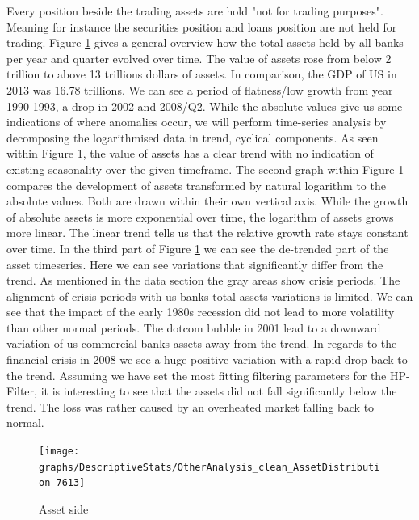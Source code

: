 \documentclass[12pt, a4paper]{article} %
\begin{document}
 Every position beside the trading assets are hold "not for trading purposes". Meaning for instance the securities position and loans position are not held for trading. 
 Figure \ref{fig:assets} gives a general overview how the total assets held by all banks per year and quarter evolved over time. The value of assets rose from below 2 trillion to above 13 trillions dollars of assets. In comparison, the GDP of US in 2013 was 16.78 trillions. We can see a period of flatness/low growth from  year 1990-1993, a drop in 2002 and 2008/Q2. While the absolute values give us some indications of where anomalies occur, we will perform time-series analysis by decomposing the logarithmised data in trend, cyclical components. As seen within Figure \ref{fig:assets}, the value of assets has a clear trend with no indication of existing seasonality over the given timeframe. The second graph within Figure \ref{fig:assets} compares the development of assets transformed by natural logarithm to the absolute values. Both are drawn within their own vertical axis. While the growth of absolute assets is more exponential over time, the logarithm of assets grows more linear. The linear trend tells us that the relative growth rate stays constant over time. In the third part of Figure \ref{fig:assets} we can see the de-trended part of the asset timeseries. Here we can see variations that significantly differ from the trend. As mentioned in the data section the gray areas show crisis periods. The alignment of crisis periods with us banks total assets variations is limited. We can see that the impact of the early 1980s recession did not lead to more volatility than other normal periods. The dotcom bubble in 2001 lead to a downward variation of us commercial banks assets away from the trend. In regards to the financial crisis in 2008 we see a huge positive variation with a rapid drop back to the trend. Assuming we have set the most fitting filtering parameters for the HP-Filter, it is interesting to see that the assets did not fall significantly below the trend. The loss was rather caused by an overheated market falling back to normal.
 
  
\begin{figure}[hbtp]
\centering
\caption{Asset side}
\texttt{[image: graphs/DescriptiveStats/OtherAnalysis\_clean\_AssetDistribution\_7613]}
\label{fig:assets}
\end{figure}
\end{document}
